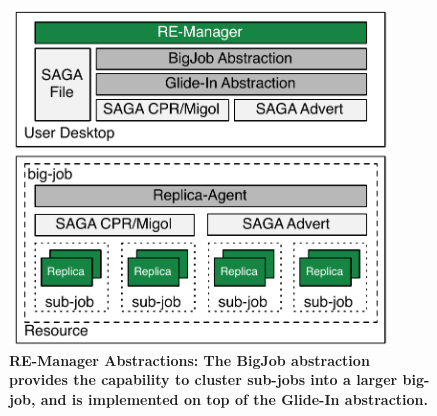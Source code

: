 \documentclass{rspublic}
\begin{document}
\begin{figure}[t]
  \begin{minipage}[t]{.47\textwidth}
    \begin{center}  
      \includegraphics[width=0.9\textwidth]{remdmanager_v13}
      \caption{\footnotesize \bf RE-Manager Abstractions: The BigJob
          abstraction provides the capability to cluster sub-jobs into a
          larger big-job, and is implemented on top of the Glide-In
          abstraction.\vspace*{-3em}}
     \label{fig:abstractions} 
    \end{center}
  \end{minipage}
  \hfill
  \begin{minipage}[t]{.51\textwidth}
    \begin{center}  
     

\end{center}
\end{minipage}
\end{figure}
\end{document}
